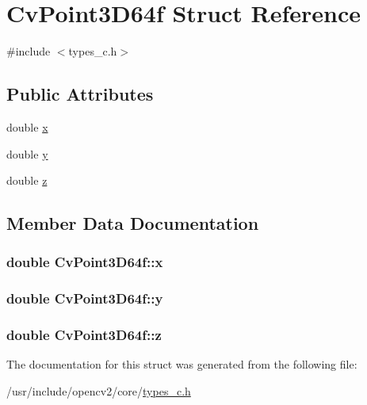 \hypertarget{structCvPoint3D64f}{\section{Cv\-Point3\-D64f Struct Reference}
\label{structCvPoint3D64f}
}


{\ttfamily \#include $<$types\-\_\-c.\-h$>$}

\subsection*{Public Attributes}
\begin{DoxyCompactItemize}
\item 
double \hyperlink{structCvPoint3D64f_adcf0f3259a824e37e34c8396060c5a72}{x}
\item 
double \hyperlink{structCvPoint3D64f_a1feb4723ecdd53963ea4cbd498660f3e}{y}
\item 
double \hyperlink{structCvPoint3D64f_a5fbe006d07307a468df4ab74d9f0df58}{z}
\end{DoxyCompactItemize}


\subsection{Member Data Documentation}
\hypertarget{structCvPoint3D64f_adcf0f3259a824e37e34c8396060c5a72}{
\subsubsection[{x}]{\setlength{\rightskip}{0pt plus 5cm}double Cv\-Point3\-D64f\-::x}}\label{structCvPoint3D64f_adcf0f3259a824e37e34c8396060c5a72}
\hypertarget{structCvPoint3D64f_a1feb4723ecdd53963ea4cbd498660f3e}{
\subsubsection[{y}]{\setlength{\rightskip}{0pt plus 5cm}double Cv\-Point3\-D64f\-::y}}\label{structCvPoint3D64f_a1feb4723ecdd53963ea4cbd498660f3e}
\hypertarget{structCvPoint3D64f_a5fbe006d07307a468df4ab74d9f0df58}{
\subsubsection[{z}]{\setlength{\rightskip}{0pt plus 5cm}double Cv\-Point3\-D64f\-::z}}\label{structCvPoint3D64f_a5fbe006d07307a468df4ab74d9f0df58}


The documentation for this struct was generated from the following file\-:\begin{DoxyCompactItemize}
\item 
/usr/include/opencv2/core/\hyperlink{core_2types__c_8h}{types\-\_\-c.\-h}\end{DoxyCompactItemize}
